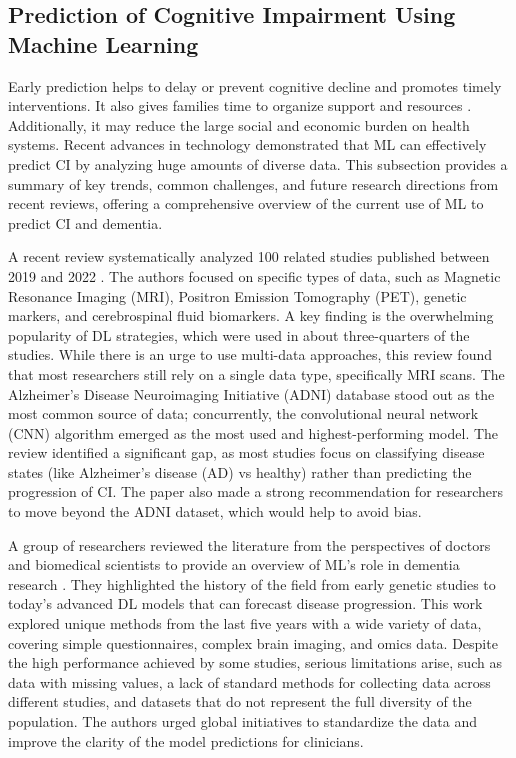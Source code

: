 \subsection{Prediction of Cognitive Impairment Using Machine Learning}
Early prediction helps to delay or prevent cognitive decline and promotes timely interventions. It also gives families time to organize support and resources \cite{Alzheimer2025}. Additionally, it may reduce the large social and economic burden on health systems. Recent advances in technology demonstrated that ML can effectively predict CI by analyzing huge amounts of diverse data. This subsection provides a summary of key trends, common challenges, and future research directions from recent reviews, offering a comprehensive overview of the current use of ML to predict CI and dementia.

A recent review systematically analyzed 100 related studies published between 2019 and 2022 \cite{Kaur2024Systematic}. The authors focused on specific types of data, such as Magnetic Resonance Imaging (\acrshort{MRI}), Positron Emission Tomography (\acrshort{PET}), genetic markers, and cerebrospinal fluid biomarkers. A key finding is the overwhelming popularity of DL strategies, which were used in about three-quarters of the studies. While there is an urge to use multi-data approaches, this review found that most researchers still rely on a single data type, specifically MRI scans. The Alzheimer’s Disease Neuroimaging Initiative (\acrshort{ADNI}) database stood out as the most common source of data; concurrently, the convolutional neural network (\acrshort{CNN}) algorithm emerged as the most used and highest-performing model. The review identified a significant gap, as most studies focus on classifying disease states (like Alzheimer’s disease (\acrshort{AD}) \acrshort{vs} healthy) rather than predicting the progression of CI. The paper also made a strong recommendation for researchers to move beyond the ADNI dataset, which would help to avoid bias.

A group of researchers reviewed the literature from the perspectives of doctors and biomedical scientists to provide an overview of ML's role in dementia research \cite{Wang2024Understanding}. They highlighted the history of the field from early genetic studies to today's advanced DL models that can forecast disease progression. This work explored unique methods from the last five years with a wide variety of data, covering simple questionnaires, complex brain imaging, and omics data. Despite the high performance achieved by some studies, serious limitations arise, such as data with missing values, a lack of standard methods for collecting data across different studies, and datasets that do not represent the full diversity of the population. The authors urged global initiatives to standardize the data and improve the clarity of the model predictions for clinicians. 


